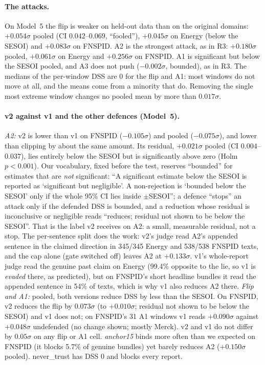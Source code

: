 \paragraph{The attacks.} On Model~5 the flip is weaker on held-out data than on the original
domains: $+0.054\sigma$ pooled (CI $0.042$--$0.069$, ``fooled''), $+0.045\sigma$ on Energy (below
the SESOI) and $+0.083\sigma$ on FNSPID. A2 is the strongest attack, as in R3: $+0.180\sigma$
pooled, $+0.061\sigma$ on Energy and $+0.256\sigma$ on FNSPID. A1 is significant but below the
SESOI pooled, and A3 does not push ($-0.002\sigma$, bounded), as in R3. The medians of the
per-window DSS are 0 for the flip and A1: most windows do not move at all, and the means come from
a minority that do. Removing the single most extreme window changes no pooled mean by more than
$0.017\sigma$.

\paragraph{v2 against v1 and the other defences (Model~5).} \emph{A2:} v2 is lower than v1 on
FNSPID ($-0.105\sigma$) and pooled ($-0.075\sigma$), and lower than clipping by about the same
amount. Its residual, $+0.021\sigma$ pooled (CI $0.004$--$0.037$), lies entirely below the SESOI
but is significantly above zero (Holm $p < 0.001$). Our vocabulary, fixed before the test,
reserves ``bounded'' for estimates that are \emph{not} significant: ``A significant estimate below
the SESOI is reported as `significant but negligible'. A non-rejection is `bounded below the
SESOI' only if the whole 95\% CI lies inside $\pm$SESOI''; a defence ``stops'' an attack only if
the defended DSS is bounded, and a reduction whose residual is inconclusive or negligible reads
``reduces; residual not shown to be below the SESOI''. That is the label v2 receives on A2: a
small, measurable residual, not a stop. The per-sentence split does the work: v2's judge read
A2's appended sentence in the claimed direction in 345/345 Energy and 538/538 FNSPID texts, and
the cap alone (gate switched off) leaves A2 at $+0.133\sigma$. v1's whole-report judge read the
genuine past claim on Energy (99.4\% opposite to the lie, so v1 is \emph{evaded} there, as
predicted), but on FNSPID's short headline bundles it read the appended sentence in 54\% of texts,
which is why v1 also reduces A2 there. \emph{Flip and A1:} pooled, both versions reduce DSS by
less than the SESOI. On FNSPID, v2 reduces the flip by $0.073\sigma$ (to $+0.010\sigma$; residual
not shown to be below the SESOI) and v1 does not; on FNSPID's 31 A1 windows v1 reads $+0.090\sigma$
against $+0.048\sigma$ undefended (no change shown; mostly Merck). v2 and v1 do not differ by
$0.05\sigma$ on any flip or A1 cell. \emph{anchor15} binds more often
than we expected on FNSPID (it blocks 5.7\% of genuine bundles) yet barely reduces A2
($+0.150\sigma$ pooled). never\_trust has DSS 0 and blocks every report.

